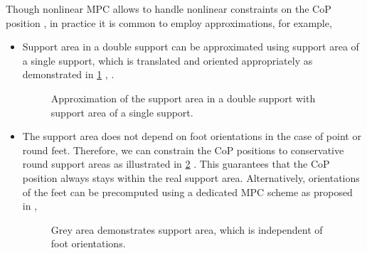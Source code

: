 Though nonlinear \ac{MPC} allows to handle nonlinear constraints on the
\ac{CoP} position \cite{Naveau2016ral}, in practice it is common to employ
approximations, for example,
%
\begin{itemize}
    \item Support area in a double support can be approximated using support
        area of a single support, which is translated and oriented
        appropriately as demonstrated in \cref{fig.ds_approximation}
        \cite{Dimitrov2011icra}, \cite[Chapter~3]{Sherikov2012master}.

        \begin{figure}[ht]
            \caption[Approximation of the support area in a double support.]{
                Approximation of the support area in a double support with
                support area of a single support.
            }
            \label{fig.ds_approximation}
        \end{figure}

    \item The support area does not depend on foot orientations in the case of
        point or round feet. Therefore, we can constrain the \ac{CoP} positions
        to conservative round support areas as illustrated in
        \cref{fig.support_rotations} \cite{Lafaye2014humanoids}. This
        guarantees that the \ac{CoP} position always stays within the real
        support area. Alternatively, orientations of the feet can be
        precomputed using a dedicated \ac{MPC} scheme as proposed in
        \cite[Chapter~2]{Herdt2012thesis},

        \begin{figure}[ht]
            \caption[Support area, which is independent of foot orientations.]{
                Grey area demonstrates support area, which is independent of
                foot orientations.
            }
            \label{fig.support_rotations}
        \end{figure}
\end{itemize}
